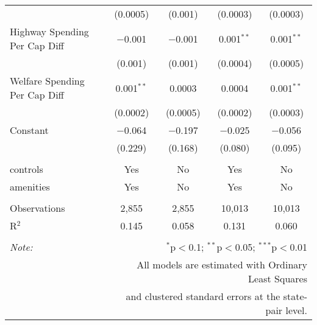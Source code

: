 \begin{table}[!htbp]
\begin{tabular}{@{\extracolsep{5pt}}lcccc}
  & (0.0005) & (0.001) & (0.0003) & (0.0003) \\ 
  Highway Spending Per Cap Diff & $-$0.001 & $-$0.001 & 0.001$^{**}$ & 0.001$^{**}$ \\ 
  & (0.001) & (0.001) & (0.0004) & (0.0005) \\ 
  Welfare Spending Per Cap Diff & 0.001$^{**}$ & 0.0003 & 0.0004 & 0.001$^{**}$ \\ 
  & (0.0002) & (0.0005) & (0.0002) & (0.0003) \\ 
  Constant & $-$0.064 & $-$0.197 & $-$0.025 & $-$0.056 \\ 
  & (0.229) & (0.168) & (0.080) & (0.095) \\ 
 \hline \\[-1.8ex] 
controls & Yes & No & Yes & No \\ 
amenities & Yes & No & Yes & No \\ 
\hline \\[-1.8ex] 
Observations & 2,855 & 2,855 & 10,013 & 10,013 \\ 
R$^{2}$ & 0.145 & 0.058 & 0.131 & 0.060 \\ 
\hline 
\hline \\[-1.8ex] 
\textit{Note:}  & \multicolumn{4}{r}{$^{*}$p$<$0.1; $^{**}$p$<$0.05; $^{***}$p$<$0.01} \\ 
 & \multicolumn{4}{r}{All models are estimated with Ordinary Least Squares} \\ 
 & \multicolumn{4}{r}{and clustered standard errors at the state-pair level.} \\ 
\end{tabular} 
\end{table} 
